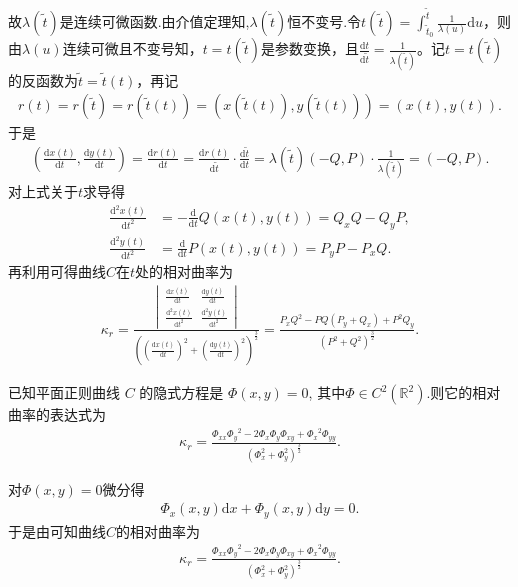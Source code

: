 \documentclass[../../main.tex]{subfiles}%
\begin{document}
\begin{solution}
故$\lambda(\tilde{t})$是连续可微函数.由介值定理知,$\lambda(\tilde{t})$恒不变号.令$t(\tilde{t})=\int_{\tilde{t}_0}^{\tilde{t}}\frac{1}{\lambda(u)}\mathrm{d}u$，则由$\lambda(u)$连续可微且不变号知，$t=t(\tilde{t})$是参数变换，且$\frac{\mathrm{d}t}{\mathrm{d}\tilde{t}}=\frac{1}{\lambda(\tilde{t})}$。记$t=t(\tilde{t})$的反函数为$\tilde{t}=\tilde{t}(t)$，再记
\begin{align*}
r(t)=r(\tilde{t})=r(\tilde{t}(t))=(x(\tilde{t}(t)),y(\tilde{t}(t)))=(x(t),y(t)).
\end{align*}
于是
\begin{align*}
\left(\frac{\mathrm{d}x(t)}{\mathrm{d}t},\frac{\mathrm{d}y(t)}{\mathrm{d}t}\right)=\frac{\mathrm{d}r(t)}{\mathrm{d}t}=\frac{\mathrm{d}r(t)}{\mathrm{d}\tilde{t}}\cdot \frac{\mathrm{d}\tilde{t}}{\mathrm{d}t}=\lambda(\tilde{t})(-Q,P)\cdot \frac{1}{\lambda(\tilde{t})}=(-Q,P).
\end{align*}
对上式关于$t$求导得
\begin{align*}
\frac{\mathrm{d}^2x(t)}{\mathrm{d}t^2}&=-\frac{\mathrm{d}}{\mathrm{d}t}Q(x(t),y(t))=Q_xQ-Q_yP,\\
\frac{\mathrm{d}^2y(t)}{\mathrm{d}t^2}&=\frac{\mathrm{d}}{\mathrm{d}t}P(x(t),y(t))=P_yP-P_xQ.
\end{align*}
再利用可得曲线$C$在$t$处的相对曲率为
\begin{align*}
\kappa_r=\frac{\begin{vmatrix}
\frac{\mathrm{d}x(t)}{\mathrm{d}t}&\frac{\mathrm{d}y(t)}{\mathrm{d}t}\\
\frac{\mathrm{d}^2x(t)}{\mathrm{d}t^2}&\frac{\mathrm{d}^2y(t)}{\mathrm{d}t^2}
\end{vmatrix}}{\left(\left(\frac{\mathrm{d}x(t)}{\mathrm{d}t}\right)^2+\left(\frac{\mathrm{d}y(t)}{\mathrm{d}t}\right)^2\right)^{\frac{3}{2}}}=\frac{P_xQ^2-PQ(P_y+Q_x)+P^2Q_y}{(P^2+Q^2)^{\frac{3}{2}}}.
\end{align*}

\end{solution}

\begin{corollary}
已知平面正则曲线 $C$ 的隐式方程是 $\Phi(x,y)=0$, 其中$\Phi\in C^2(\mathbb{R}^2)$.则它的相对曲率的表达式为
\begin{align*}
\kappa _r=\frac{\Phi _{xx}{\Phi _y}^2-2\Phi _x\Phi _y\Phi _{xy}+{\Phi _x}^2\Phi _{yy}}{\left( \Phi _{x}^{2}+\Phi _{y}^{2} \right) ^{\frac{3}{2}}}.
\end{align*}
\end{corollary}
\begin{solution}

对$\Phi(x,y)=0$微分得
\begin{align*}
\Phi _x\left( x,y \right) \mathrm{d}x+\Phi _y\left( x,y \right) \mathrm{d}y=0.
\end{align*}
于是由可知曲线$C$的相对曲率为
\begin{align*}
\kappa _r=\frac{\Phi _{xx}{\Phi _y}^2-2\Phi _x\Phi _y\Phi _{xy}+{\Phi _x}^2\Phi _{yy}}{\left( \Phi _{x}^{2}+\Phi _{y}^{2} \right) ^{\frac{3}{2}}}.
\end{align*}

\end{solution}
\end{document}
